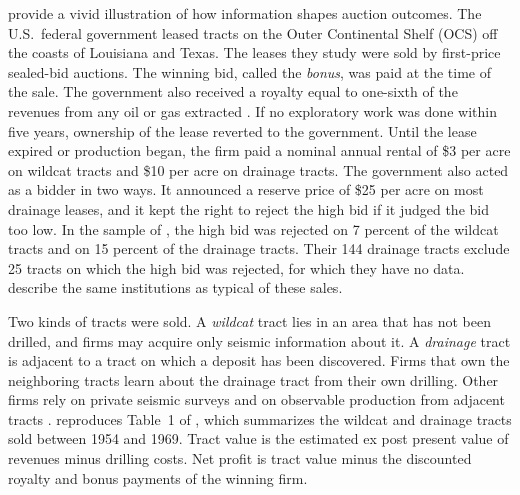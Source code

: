 \citet{HendricksPorter1988} provide a vivid illustration of how information shapes auction outcomes. The
U.S.\ federal government leased tracts on the Outer Continental Shelf (OCS) off the coasts of Louisiana and
Texas. The leases they study were sold by first-price sealed-bid auctions. The winning bid, called the \emph{bonus},
was paid at the time of the sale. The government also received a royalty equal to one-sixth of the
revenues from any oil or gas extracted \citep[p.~871]{HendricksPorter1988}. If no exploratory work was done
within five years, ownership of the lease reverted to the government. Until the lease expired or production
began, the firm paid a nominal annual rental of \$3 per acre on wildcat tracts and \$10 per acre on drainage
tracts. The government also acted as a bidder in two ways. It announced a reserve price of \$25 per acre on
most drainage leases, and it kept the right to reject the high bid if it judged the bid too low. In the
sample of \citet[p.~871]{HendricksPorter1988}, the high bid was rejected on 7 percent of the wildcat tracts
and on 15 percent of the drainage tracts. Their 144 drainage tracts exclude 25 tracts on which the high bid
was rejected, for which they have no data. \citet[Section~4.1, p.~124]{HortacsuPerrigne2021} describe the
same institutions as typical of these sales.

Two kinds of tracts were sold. A \emph{wildcat} tract lies in an area that has not been drilled, and firms
may acquire only seismic information about it. A \emph{drainage} tract is adjacent to a tract on which a
deposit has been discovered. Firms that own the neighboring tracts learn about the drainage tract from
their own drilling. Other firms rely on private seismic surveys and on observable production from adjacent
tracts \citep[pp.~865--866]{HendricksPorter1988}.  reproduces Table~1 of
\citet{HendricksPorter1988}, which summarizes the wildcat and drainage tracts sold between 1954 and 1969.
Tract value is the estimated ex post present value of revenues minus drilling costs. Net profit is tract
value minus the discounted royalty and bonus payments of the winning firm.

